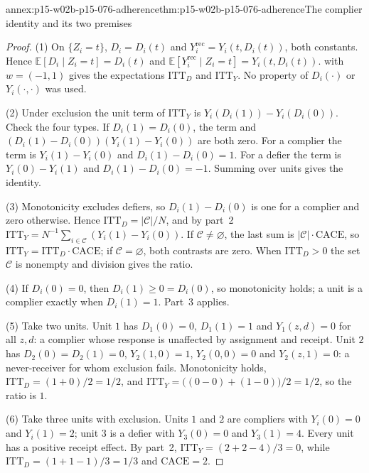 \begin{annexitem}{annex:p15-w02b-p15-076-adherence}{thm:p15-w02b-p15-076-adherence}{The complier identity and its two premises}
\begin{proof}
(1) On \(\{Z_i=t\}\), \(D_i=D_i(t)\) and
\(Y_i^{\mathrm{rec}}=Y_i(t,D_i(t))\), both constants. Hence
\(\mathbb E[D_i\mid Z_i=t]=D_i(t)\) and
\(\mathbb E[Y_i^{\mathrm{rec}}\mid Z_i=t]=Y_i(t,D_i(t))\).
 with \(w=(-1,1)\) gives the
expectations \(\mathrm{ITT}_D\) and \(\mathrm{ITT}_Y\). No property of
\(D_i(\cdot)\) or \(Y_i(\cdot,\cdot)\) was used.

(2) Under exclusion the unit term of \(\mathrm{ITT}_Y\) is
\(Y_i(D_i(1))-Y_i(D_i(0))\). Check the four types. If
\(D_i(1)=D_i(0)\), the term and \((D_i(1)-D_i(0))(Y_i(1)-Y_i(0))\) are
both zero. For a complier the term is \(Y_i(1)-Y_i(0)\) and
\(D_i(1)-D_i(0)=1\). For a defier the term is \(Y_i(0)-Y_i(1)\) and
\(D_i(1)-D_i(0)=-1\). Summing over units gives the identity.

(3) Monotonicity excludes defiers, so \(D_i(1)-D_i(0)\) is one for a
complier and zero otherwise. Hence \(\mathrm{ITT}_D=|\mathcal C|/N\), and by
part~2 \(\mathrm{ITT}_Y=N^{-1}\sum_{i\in\mathcal C}(Y_i(1)-Y_i(0))\). If
\(\mathcal C\ne\varnothing\), the last sum is
\(|\mathcal C|\cdot\mathrm{CACE}\), so
\(\mathrm{ITT}_Y=\mathrm{ITT}_D\cdot\mathrm{CACE}\); if
\(\mathcal C=\varnothing\), both contrasts are zero. When
\(\mathrm{ITT}_D>0\) the set \(\mathcal C\) is nonempty and division gives
the ratio.

(4) If \(D_i(0)=0\), then \(D_i(1)\geq0=D_i(0)\), so monotonicity holds;
a unit is a complier exactly when \(D_i(1)=1\). Part~3 applies.

(5) Take two units. Unit \(1\) has \(D_1(0)=0\), \(D_1(1)=1\) and
\(Y_1(z,d)=0\) for all \(z,d\): a complier whose response is unaffected by
assignment and receipt. Unit \(2\) has \(D_2(0)=D_2(1)=0\),
\(Y_2(1,0)=1\), \(Y_2(0,0)=0\) and \(Y_2(z,1)=0\): a never-receiver for
whom exclusion fails. Monotonicity holds,
\(\mathrm{ITT}_D=(1+0)/2=1/2\), and
\(\mathrm{ITT}_Y=\bigl((0-0)+(1-0)\bigr)/2=1/2\), so the ratio is \(1\).

(6) Take three units with exclusion. Units \(1\) and \(2\) are compliers
with \(Y_i(0)=0\) and \(Y_i(1)=2\); unit \(3\) is a defier with
\(Y_3(0)=0\) and \(Y_3(1)=4\). Every unit has a positive receipt effect.
By part~2, \(\mathrm{ITT}_Y=(2+2-4)/3=0\), while
\(\mathrm{ITT}_D=(1+1-1)/3=1/3\) and \(\mathrm{CACE}=2\).
\end{proof}
\end{annexitem}

